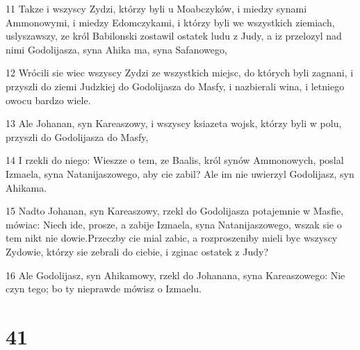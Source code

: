 \par 11 Takze i wszyscy Zydzi, którzy byli u Moabczyków, i miedzy synami Ammonowymi, i miedzy Edomczykami, i którzy byli we wszystkich ziemiach, uslyszawszy, ze król Babilonski zostawil ostatek ludu z Judy, a iz przelozyl nad nimi Godolijasza, syna Ahika ma, syna Safanowego,
\par 12 Wrócili sie wiec wszyscy Zydzi ze wszystkich miejsc, do których byli zagnani, i przyszli do ziemi Judzkiej do Godolijasza do Masfy, i nazbierali wina, i letniego owocu bardzo wiele.
\par 13 Ale Johanan, syn Kareaszowy, i wszyscy ksiazeta wojsk, którzy byli w polu, przyszli do Godolijasza do Masfy,
\par 14 I rzekli do niego: Wieszze o tem, ze Baalis, król synów Ammonowych, poslal Izmaela, syna Natanijaszowego, aby cie zabil? Ale im nie uwierzyl Godolijasz, syn Ahikama.
\par 15 Nadto Johanan, syn Kareaszowy, rzekl do Godolijasza potajemnie w Masfie, mówiac: Niech ide, prosze, a zabije Izmaela, syna Natanijaszowego, wszak sie o tem nikt nie dowie.Przeczby cie mial zabic, a rozproszeniby mieli byc wszyscy Zydowie, którzy sie zebrali do ciebie, i zginac ostatek z Judy?
\par 16 Ale Godolijasz, syn Ahikamowy, rzekl do Johanana, syna Kareaszowego: Nie czyn tego; bo ty nieprawde mówisz o Izmaelu.

\chapter{41}

